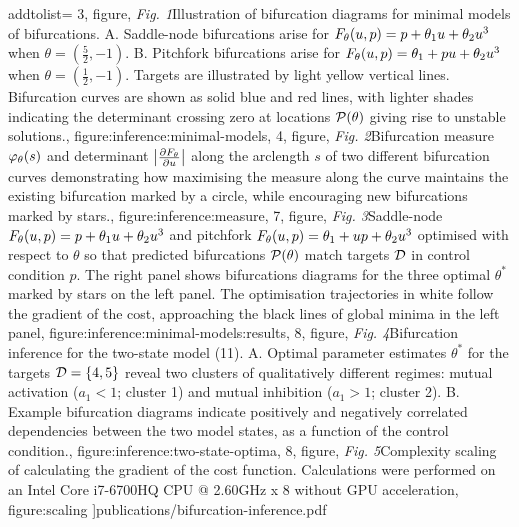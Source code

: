     addtolist={
        3, figure, {\textit{Fig. 1}\quad Illustration of bifurcation diagrams for minimal models of bifurcations. A. Saddle-node bifurcations arise for $F_{\theta}(u,p) = p + \theta_{1}u+\theta_{2}u^3$ when $\theta = (\frac{5}{2},-1)$. B. Pitchfork bifurcations arise for $F_{\theta}(u,p) = \theta_{1} + p u+\theta_{2}u^3$ when $\theta=(\frac{1}{2},-1)$. Targets are illustrated by light yellow vertical lines. Bifurcation curves are shown as solid blue and red lines, with lighter shades indicating the determinant crossing zero at locations $\mathcal{P}(\theta)$ giving rise to unstable solutions.}, figure:inference:minimal-models,
        4, figure, {\textit{Fig. 2}\quad Bifurcation measure $\varphi_{\theta}(s)$ and determinant $\left| \frac{\partial F_{\theta}}{\partial u} \right|$ along the arclength $s$ of two different bifurcation curves demonstrating how maximising the measure along the curve maintains the existing bifurcation marked by a circle, while encouraging new bifurcations marked by stars.}, figure:inference:measure,
        7, figure, {\textit{Fig. 3}\quad Saddle-node $F_{\theta}(u,p) = p + \theta_{1}u+\theta_{2}u^3$ and pitchfork $F_{\theta}(u,p) = \theta_{1} + u p +\theta_{2}u^3$ optimised with respect to $\theta$ so that predicted bifurcations $\mathcal{P}(\theta)$ match targets $\mathcal{D}$ in control condition $p$. The right panel shows bifurcations diagrams for the three optimal $\theta^*$ marked by stars on the left panel. The optimisation trajectories in white follow the gradient of the cost, approaching the black lines of global minima in the left panel}, figure:inference:minimal-models:results,
        8, figure, {\textit{Fig. 4}\quad Bifurcation inference for the two-state model (11). A. Optimal parameter estimates $\theta^*$ for the targets $\mathcal{D}=\{4,5\}$ reveal two clusters of qualitatively different regimes: mutual activation ($a_1 < 1$; cluster 1) and mutual inhibition ($a_1 > 1$; cluster 2). B. Example bifurcation diagrams indicate positively and negatively correlated dependencies between the two model states, as a function of the control condition.}, figure:inference:two-state-optima,
        8, figure, {\textit{Fig. 5}\quad Complexity scaling of calculating the gradient of the cost function. Calculations were performed on an Intel Core i7-6700HQ CPU @ 2.60GHz x 8 without GPU acceleration}, figure:scaling
}]{publications/bifurcation-inference.pdf}